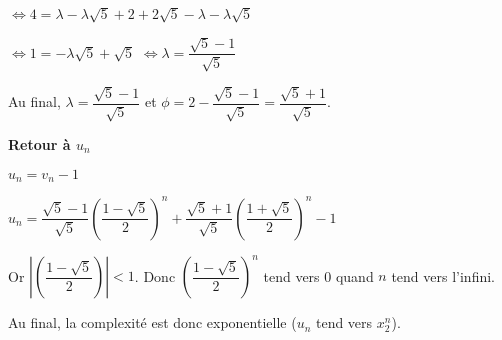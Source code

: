\documentclass[10pt,fleqn]{article} %
\begin{document}
\begin{multicols}{2}
$\Leftrightarrow 4=\lambda-\lambda\sqrt{5}+ 2+2\sqrt{5}-\lambda - \lambda\sqrt{5}$

$\Leftrightarrow 1=-\lambda\sqrt{5}+\sqrt{5} $
$\Leftrightarrow \lambda=\dfrac{\sqrt{5}-1}{\sqrt{5}} $

Au final, $ \lambda=\dfrac{\sqrt{5}-1}{\sqrt{5}} $ et  $\phi=2-\dfrac{\sqrt{5}-1}{\sqrt{5}}=\dfrac{\sqrt{5}+1}{\sqrt{5}}$.


\textbf{Retour à $u_n$}

$u_n = v_n-1$ 

$ u_n = \dfrac{\sqrt{5}-1}{\sqrt{5}} \left(\dfrac{1-\sqrt{5}}{2}\right)^n+\dfrac{\sqrt{5}+1}{\sqrt{5}} \left(\dfrac{1+\sqrt{5}}{2}\right)^n -1$


Or $\left|  \left(\dfrac{1-\sqrt{5}}{2}\right) \right| <1$. Donc $\left(\dfrac{1-\sqrt{5}}{2}\right)^n$ tend vers 0 quand $n$ tend vers l'infini.

Au final, la complexité est donc exponentielle ($u_n$ tend vers $x_2^n$).
\ifprof
\else
\end{multicols}
\fi
\end{document}
